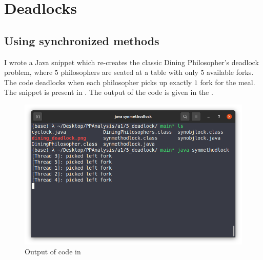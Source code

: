 \documentclass{article}
\begin{document}
  \section{Deadlocks}
    \subsection{Using synchronized methods}
      I wrote a Java snippet which re-creates the classic Dining Philosopher's deadlock problem, where $5$ philosophers are seated at a table with only $5$ available forks. The code deadlocks when each philosopher picks up exactly $1$ fork for the meal. The snippet is present in . The output of the code is given in the .

      

      \begin{figure}[ht]
        \centering
        \includegraphics[scale=0.5]{5_deadlock/synchronized_method_deadlock.png}
        \caption{Output of code in }
        \label{fig::51}
      \end{figure}
\end{document}
